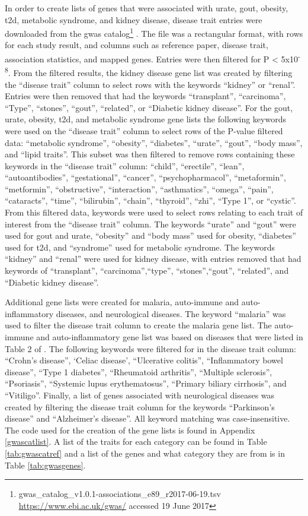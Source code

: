 \documentclass[twoside,openright]{report}
\begin{document}
In order to create lists of genes that were associated with urate, gout,
obesity, \gls{t2d}, metabolic syndrome, and kidney disease, disease
trait entries were downloaded from the \gls{gwas} catalog\footnote{gwas\_catalog\_v1.0.1-associations\_e89\_r2017-06-19.tsv
  \url{https://www.ebi.ac.uk/gwas/} accessed 19 June 2017}
\citep{MacArthur2017}. The file was a rectangular format, with rows for
each study result, and columns such as reference paper, disease trait,
association statistics, and mapped genes. Entries were then filtered for
P \textless{} 5x10\textsuperscript{-8}. From the filtered results, the
kidney disease gene list was created by filtering the ``disease trait''
column to select rows with the keywords ``kidney'' or ``renal''. Entries
were then removed that had the keywords ``transplant'', ``carcinoma'',
``Type'', ``stones'', ``gout'', ``related'', or ``Diabetic kidney
disease''. For the gout, urate, obesity, \gls{t2d}, and metabolic
syndrome gene lists the following keywords were used on the ``disease
trait'' column to select rows of the P-value filtered data: ``metabolic
syndrome'', ``obesity'', ``diabetes'', ``urate'', ``gout'', ``body
mass'', and ``lipid traits''. This subset was then filtered to remove
rows containing these keywords in the ``disease trait'' column:
``child'', ``erectile'', ``lean'', ``autoantibodies'', ``gestational'',
``cancer'', ``psychopharmacol'', ``metaformin'', ``metformin'',
``obstructive'', ``interaction'', ``asthmatics'', ``omega'', ``pain'',
``cataracts'', ``time'', ``bilirubin'', ``chain'', ``thyroid'', ``zhi'',
``Type 1'', or ``cystic''. From this filtered data, keywords were used
to select rows relating to each trait of interest from the ``disease
trait'' column. The keywords ``urate'' and ``gout'' were used for gout
and urate, ``obesity'' and ``body mass'' used for obesity, ``diabetes''
used for \gls{t2d}, and ``syndrome'' used for metabolic syndrome. The
keywords ``kidney'' and ``renal'' were used for kidney disease, with
entries removed that had keywords of ``transplant'',
``carcinoma'',``type'', ``stones'',``gout'', ``related'', and ``Diabetic
kidney disease''.

Additional gene lists were created for malaria, auto-immune and
auto-inflammatory diseases, and neurological diseases. The keyword
``malaria'' was used to filter the disease trait column to create the
malaria gene list. The auto-immune and auto-inflammatory gene list was
based on diseases that were listed in Table 2 of \citet{Zhang2013a}. The
following keywords were filtered for in the disease trait column:
``Crohn's disease'', `Celiac disease', ``Ulcerative colitis'',
``Inflammatory bowel disease'', ``Type 1 diabetes'', ``Rheumatoid
arthritis'', ``Multiple sclerosis'', ``Psoriasis'', ``Systemic lupus
erythematosus'', ``Primary biliary cirrhosis'', and ``Vitiligo''.
Finally, a list of genes associated with neurological diseases was
created by filtering the disease trait column for the keywords
``Parkinson's disease'' and ``Alzheimer's disease''. All keyword
matching was case-insensitive. The code used for the creation of the
gene lists is found in Appendix \ref{gwascatlist}. A list of the traits
for each category can be found in Table \ref{tab:gwascatref} and a list
of the genes and what category they are from is in Table
\ref{tab:gwasgenes}.
\end{document}
